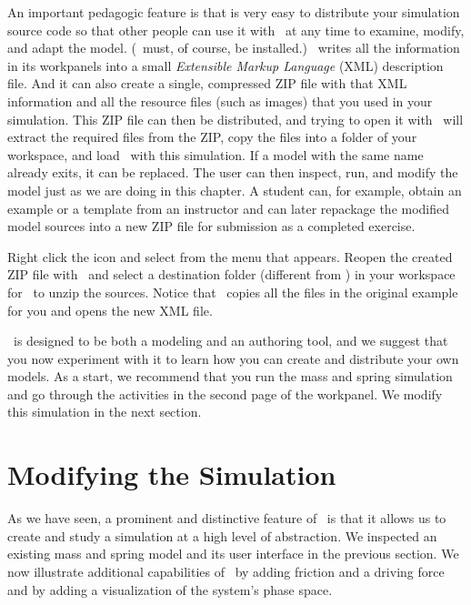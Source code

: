 An important pedagogic feature is that is very easy to distribute your simulation source code so that other people can use it with \ejs\ at any time to examine, modify, and adapt the model. (\ejs\ must, of course, be installed.)  \ejs\ writes all the information in its workpanels into a small \emph{Extensible Markup Language} (XML) description file. And it can also create a single, compressed ZIP file with that XML information and all the resource files (such as images) that you used in your simulation. This ZIP file can then be distributed, and trying to open it with \ejs\ will extract the required files from the ZIP, copy the files into a folder of your workspace, and load \ejs\ with this simulation. If a model with the same name already exits, it can be replaced. The user can then inspect, run, and modify the model just as we are doing in this chapter.  A student can, for example, obtain an example or a template from an instructor and can later repackage the modified model sources into a new ZIP file for submission as a completed exercise.

\begin{exercise}\label{ex:03ExplorationJavascript/redistribution}
Right click the  icon and select  from the menu that appears.  Reopen the created ZIP file with \ejs\ and select a destination folder (different from ) in your workspace for \ejs\ to unzip the sources. Notice that \ejs\ copies all the files in the original example for you and opens the new  XML file.
\end{exercise}

\ejs\ is designed to be both a modeling and an authoring tool, and we suggest that you now experiment with it to learn
how you can create and distribute your own models. As a start, we recommend that you run the mass and spring simulation
and go through the activities in the second page of the  workpanel.  We modify this simulation in the next
section.

\section{Modifying the Simulation}\label{section:03ExplorationJavascriptModifying}

As we have seen, a prominent and distinctive feature of \Ejs\ is that it allows us to create and study a simulation at
a high level of abstraction. We inspected an existing mass and spring model and its user interface in the previous
section. We now illustrate additional capabilities of \Ejs\ by adding friction and a driving force and by adding a
visualization of the system's phase space.


